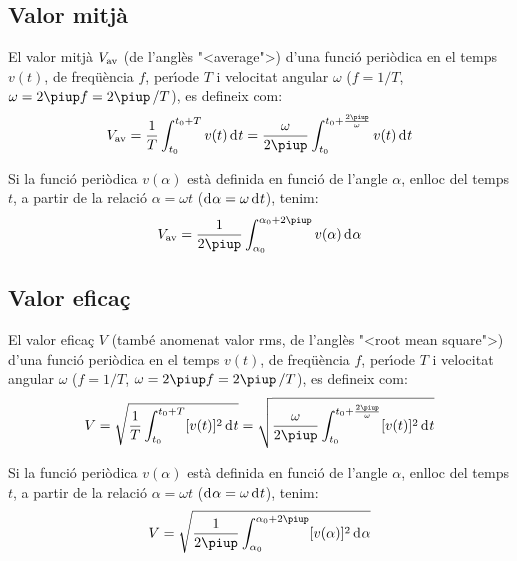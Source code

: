 \subsection{Valor mitj\`{a}}

El valor mitj\`{a} $V_\mathrm{av}$ (de l'angl\`{e}s {"<}average{">}) d'una funci\'{o}
peri\`{o}dica en el temps $v(t)$, de freq\"{u}\`{e}ncia $f$, per\'{\i}ode $T$ i
velocitat angular $\omega$ ($f = 1/T$, $\omega=2\piup f = 2\piup\,/T$), es
defineix com:
\begin{equation}
    V\ped{av} = \frac{1}{T} \int_{t_0}^{t_0+T} v(t) \diff t =
    \frac{\omega}{2\piup} \int_{t_0}^{t_0+\frac{2\piup}{\omega}} v(t) \diff t\label{eq:vm_t}
\end{equation}

Si la funci\'{o} peri\`{o}dica $v(\alpha)$ est\`{a} definida en funci\'{o} de
l'angle $\alpha$, enlloc del temps $t$, a partir de la relaci\'{o}
$\alpha=\omega t$ ($\diff\alpha=\omega\diff t$), tenim:
\begin{equation}
    V\ped{av} = \frac{1}{2\piup} \int_{\alpha_0}^{\alpha_0+2\piup} v(\alpha) \diff \alpha
    \label{eq:vm_alfa}
\end{equation}

\subsection{Valor efica\c{c}}

El valor efica\c{c}  $V$ (tamb\'{e} anomenat valor rms, de l'angl\`{e}s {"<}root
mean square{">}) d'una funci\'{o} peri\`{o}dica en el temps $v(t)$, de
freq\"{u}\`{e}ncia $f$, per\'{\i}ode $T$ i velocitat angular $\omega$ ($f = 1/T$,
$\omega=2\piup f = 2\piup\,/T$), es defineix com:
\begin{equation}
    V = \sqrt{\frac{1}{T} \int_{t_0}^{t_0+T} [v(t)]^2 \diff
    t} = \sqrt{\frac{\omega}{2\piup} \int_{t_0}^{t_0+\frac{2\piup}{\omega}}
     [v(t)]^2 \diff t}
\end{equation}

Si la funci\'{o} peri\`{o}dica $v(\alpha)$ est\`{a} definida en funci\'{o} de
l'angle $\alpha$, enlloc del temps $t$, a partir de la relaci\'{o}
$\alpha=\omega t$ ($\diff\alpha=\omega\diff t$), tenim:
\begin{equation}
    V = \sqrt{\frac{1}{2\piup} \int_{\alpha_0}^{\alpha_0+2\piup}
     [v(\alpha)]^2 \diff \alpha}
\end{equation}

